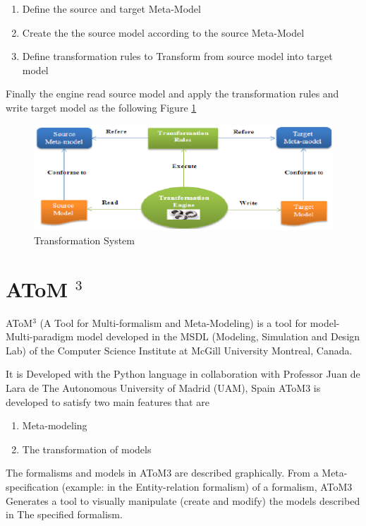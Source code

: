 \begin{enumerate}
\item Define the  source and target Meta-Model 
\item Create the the source model according to the source Meta-Model 
\item Define transformation rules to Transform from source model into target model 
\end{enumerate}
\vspace{1cm}
Finally the engine read source model and apply the transformation rules and write target model
as the following Figure \ref{fig:Transformation System}
\vspace{1cm} 

\begin{figure}[th]
	\centering
		\includegraphics{Chapiter3/img/sys}
	\caption{\label{fig:Transformation System}Transformation System}
\end{figure} 
 
\pagebreak

\section{AToM $^{3}$}

AToM$^{3}$ (A Tool for Multi-formalism and Meta-Modeling) is a tool for model-
Multi-paradigm model developed in the MSDL (Modeling, Simulation and
Design Lab) of the Computer Science Institute at McGill University Montreal, Canada.

It is Developed with the Python language in collaboration with Professor Juan de Lara de
The Autonomous University of Madrid (UAM), Spain  
AToM3 is developed to satisfy two main features that are 
\begin{enumerate}
\item Meta-modeling 
\item The transformation of models
\end{enumerate}

The formalisms and models in AToM3 are described graphically. 
From a Meta-specification (example: in the Entity-relation formalism) of a formalism, AToM3
Generates a tool to visually manipulate (create and modify) the models described in
The specified formalism.

